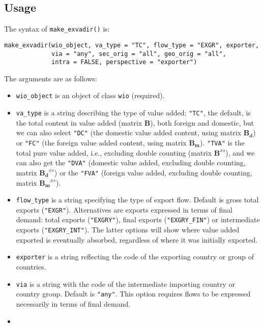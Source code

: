 \hypertarget{usage-2}{%
\subsection{Usage}\label{usage-2}}

The syntax of \texttt{make\_exvadir()} is:

\begin{verbatim}
make_exvadir(wio_object, va_type = "TC", flow_type = "EXGR", exporter,
             via = "any", sec_orig = "all", geo_orig = "all",
             intra = FALSE, perspective = "exporter")
\end{verbatim}

The arguments are as follows:

\begin{itemize}
\tightlist
\item
  \texttt{wio\_object} is an object of class \texttt{wio} (required).
\item
  \texttt{va\_type} is a string describing the type of value added: \texttt{"TC"},
  the default, is the total content in value added (matrix \(\mathbf{B}\)), both
  foreign and domestic, but we can also select \texttt{"DC"} (the domestic value
  added content, using matrix \(\mathbf{B_d}\)) or \texttt{"FC"} (the foreign value
  added content, using matrix \(\mathbf{B_m}\)). \texttt{"TVA"} is the total pure
  value added, i.e., excluding double counting (matrix
  \(\mathbf{B}^{xs}\)), and we can also get the \texttt{"DVA"} (domestic
  value added, excluding double counting, matrix \(\mathbf{B_d}^{xs}\)) or
  the \texttt{"FVA"} (foreign value added, excluding double counting, matrix
  \(\mathbf{B_m}^{xs}\)).
\item
  \texttt{flow\_type} is a string specifying the type of export flow. Default is
  gross total exports (\texttt{"EXGR"}). Alternatives are exports expressed
  in terms of final demand: total exports (\texttt{"EXGRY"}), final exports
  (\texttt{"EXGRY\_FIN"}) or intermediate exports (\texttt{"EXGRY\_INT"}). The latter
  options will show where value added exported is eventually absorbed,
  regardless of where it was initially exported.
\item
  \texttt{exporter} is a string reflecting the code of the exporting country or
  group of countries.
\item
  \texttt{via} is a string with the code of the intermediate importing country or
  country group. Default is \texttt{"any"}. This option requires flows to be expressed
  necessarily in terms of final demand.
\item

\end{itemize}
